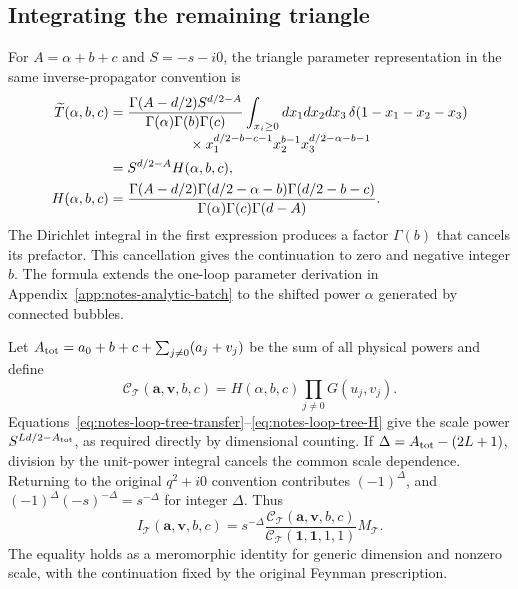 \subsection{Integrating the remaining triangle}
For $A=\alpha+b+c$ and $S=-s-i0$, the triangle parameter representation in the same inverse-propagator convention is
\begin{align}
 \widetilde T(\alpha,b,c)
 &=\frac{\Gamma(A-d/2)S^{d/2-A}}
 {\Gamma(\alpha)\Gamma(b)\Gamma(c)}
 \int_{x_i\ge0}dx_1dx_2dx_3\,
 \delta(1-x_1-x_2-x_3)\notag\\[-2pt]
 &\hspace{20mm}\times x_1^{d/2-b-c-1}x_2^{b-1}
 x_3^{d/2-\alpha-b-1}\notag\\
 &=S^{d/2-A}H(\alpha,b,c),\label{eq:notes-loop-tree-triangle}\\
 H(\alpha,b,c)
 &=\frac{\Gamma(A-d/2)\Gamma(d/2-\alpha-b)\Gamma(d/2-b-c)}
 {\Gamma(\alpha)\Gamma(c)\Gamma(d-A)}.
 \label{eq:notes-loop-tree-H}
\end{align}
The Dirichlet integral in the first expression produces a factor $\Gamma(b)$ that cancels its prefactor. This cancellation gives the continuation to zero and negative integer $b$. The formula extends the one-loop parameter derivation in Appendix~\ref{app:notes-analytic-batch} to the shifted power $\alpha$ generated by connected bubbles.

Let $A_{\rm tot}=a_0+b+c+\sum_{j\ne0}(a_j+v_j)$ be the sum of all physical powers and define
\begin{equation}
 \mathcal C_{\mathcal T}(\boldsymbol a,\boldsymbol v,b,c)
 =H(\alpha,b,c)\prod_{j\ne0}G(u_j,v_j).
 \label{eq:notes-loop-tree-C}
\end{equation}
Equations~\eqref{eq:notes-loop-tree-transfer}--\eqref{eq:notes-loop-tree-H} give the scale power $S^{Ld/2-A_{\rm tot}}$, as required directly by dimensional counting. If $\Delta=A_{\rm tot}-(2L+1)$, division by the unit-power integral cancels the common scale dependence. Returning to the original $q^2+i0$ convention contributes $(-1)^\Delta$, and $(-1)^\Delta(-s)^{-\Delta}=s^{-\Delta}$ for integer $\Delta$. Thus
\begin{equation}
 I_{\mathcal T}(\boldsymbol a,\boldsymbol v,b,c)=
 s^{-\Delta}\frac{\mathcal C_{\mathcal T}(\boldsymbol a,\boldsymbol v,b,c)}
 {\mathcal C_{\mathcal T}(\boldsymbol 1,\boldsymbol 1,1,1)}M_{\mathcal T}.
 \label{eq:notes-loop-tree-reduction}
\end{equation}
The equality holds as a meromorphic identity for generic dimension and nonzero scale, with the continuation fixed by the original Feynman prescription.

